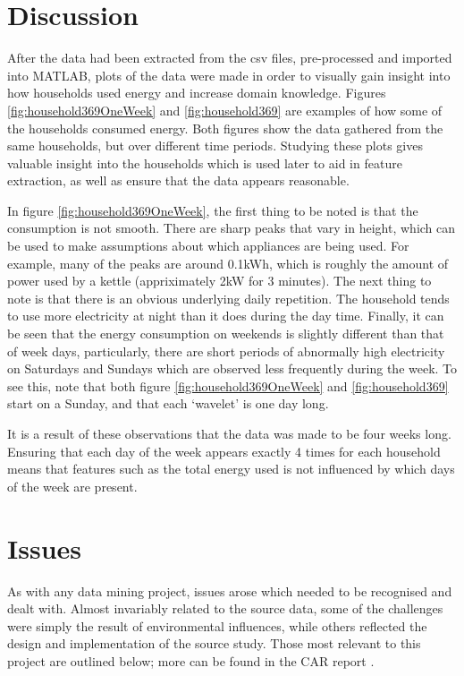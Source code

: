 \section{Discussion}

After the data had been extracted from the csv files, pre-processed and imported into MATLAB, plots of the data were made in order to visually gain insight into how households used energy and increase domain knowledge. Figures \ref{fig:household369OneWeek} and \ref{fig:household369} are examples of how some of the households consumed energy. Both figures show the data gathered from the same households, but over different time periods. Studying these plots gives valuable insight into the households which is used later to aid in feature extraction, as well as ensure that the data appears reasonable. 

In figure \ref{fig:household369OneWeek}, the first thing to be noted is that the consumption is not smooth. There are sharp peaks that vary in height, which can be used to make assumptions about which appliances are being used. For example, many of the peaks are around 0.1kWh, which is roughly the amount of power used by a kettle (appriximately 2kW for 3 minutes). The next thing to note is that there is an obvious underlying daily repetition. The household tends to use more electricity at night than it does during the day time. Finally, it can be seen that the energy consumption on weekends is slightly different than that of week days, particularly, there are short periods of abnormally high electricity on Saturdays and Sundays which are observed less frequently during the week. To see this, note that both figure \ref{fig:household369OneWeek} and \ref{fig:household369} start on a Sunday, and that each `wavelet' is one day long.

It is a result of these observations that the data was made to be four weeks long. Ensuring that each day of the week appears exactly 4 times for each household means that features such as the total energy used is not influenced by which days of the week are present.

\householdOneWeek
\householdPlot




\section{Issues}

As with any data mining project, issues arose which needed to be recognised and dealt with.  Almost invariably related to the source data, some of the challenges were simply the result of environmental influences, while others reflected the design and implementation of the source study.  Those most relevant to this project are outlined below; more can be found in the CAR report \cite{early_findings}.


